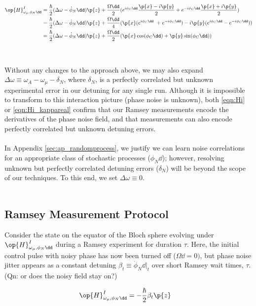 \begin{align}
\op{H}^{I}_{\omega_\mu,\phi_N\dd} & = \frac{\hbar}{2}(\Delta\omega - \dot{\phi}_N\dd)\p{z} + \frac{\Omega\dd}{2} (e^{i\phi_C\dd}\frac{\p{x} - i\p{y}}{2} + e^{-i\phi_C\dd}\frac{\p{x} + i\p{y}}{2})\\
& = \frac{\hbar}{2}(\Delta\omega - \dot{\phi}_N\dd)\p{z} + \frac{\Omega\dd}{4} (\p{x} (e^{i\phi_C\dd}\ +  e^{-i\phi_C\dd})- i\p{y} ( e^{i\phi_C\dd} - e^{-i\phi_C\dd} ))\\
& = \frac{\hbar}{2}(\Delta\omega - \dot{\phi}_N\dd)\p{z} + \frac{\Omega\dd}{2} (\p{x} \cos(\phi_C\dd) + \p{y} \sin(\phi_C\dd)) \label{eqn:Hi_kappareal}
\end{align}
\\
\\
Without any changes to the approach above, we may also expand $\Delta \omega \equiv \omega_A -\omega_\mu -\delta_N$, where $\delta_N$, is a perfectly correlated but unknown experimental error in our detuning for any single run. Although it is impossible to transform to this interaction picture (phase noise is unknown), both \ref{eqn:Hi} or \ref{eqn:Hi_kappareal} confirm that our Ramsey measurements encode the derivatives of the phase noise field, and that measurements can also encode perfectly correlated but unknown detuning errors.
\\
\\
In Appendix \ref{sec:ap_randomprocess}, we justify we can learn noise correlations for an appropriate class of stochastic processes ($\phi_N\dd$); however, resolving unknown but perfectly correlated detuning errors ($\delta_N$) will be beyond the scope of our techniques. To this end, we set $\Delta \omega \equiv 0$.
\\
\\
\subsection{Ramsey Measurement Protocol} \label{sec:ap_setup:subsec:RamseyMeasurement}

Consider the state on the equator of the Bloch sphere evolving under $\op{H}^{I}_{\omega_\mu,\phi_N\dd}$ during a Ramsey experiment for duration $\tau$. Here, the initial control pulse with noisy phase has now been turned off ($ \Omega \dd = 0)$, but phase noise jitter appears as a constant detuning $ \beta_t \equiv  \dot{\phi}_N\dd |_t$ over short Ramsey wait times, $\tau$. (Qn: or does the noisy field stay on?)

\begin{align}
\op{H}^{I}_{\omega_\mu,\phi_N\dd} & = -\frac{\hbar}{2}\beta_t\p{z}
\end{align}

